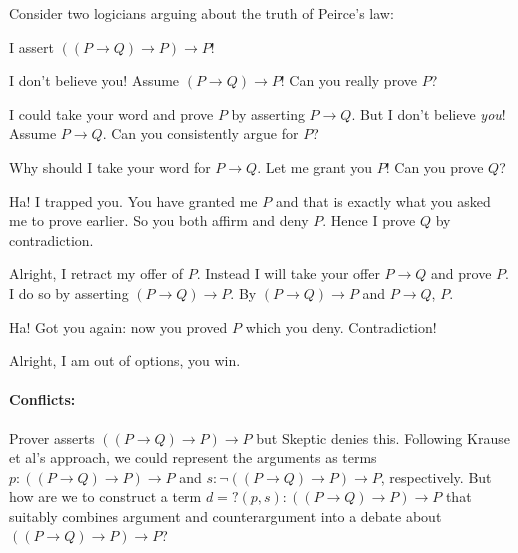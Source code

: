 \documentclass{IOS-Book-Article}
\begin{document}
\begin{example}\label{ex:prover-skeptic}
    Consider two logicians arguing about the truth of Peirce's law:

\begin{description}[leftmargin=3em,style=sameline]
\item[$P_1$:] I assert $((P\rightarrow Q)\rightarrow P)\rightarrow P$!
\item[$S_1$:] I don't believe you! Assume $(P\rightarrow Q)\rightarrow P$! Can you really prove $P$?
\item[$P_2$:] I could take your word and prove $P$ by asserting $P \rightarrow Q$. But I don't believe \emph{you}! Assume $P\rightarrow Q$. Can you consistently argue for $P$?
\item[$S_2$:] Why should I take your word for $P\rightarrow Q$. Let me grant you $P$! Can you prove $Q$?
\item[$P_3$:] Ha! I trapped you. You have granted me $P$ and that is exactly what you asked me to prove earlier. So you both affirm and deny $P$. Hence I prove $Q$ by contradiction.
\item[$S_3$:] Alright, I retract my offer of $P$. Instead I will take your offer $P\rightarrow Q$ and prove $P$. I do so by asserting $(P\rightarrow Q)\rightarrow P$. By $(P\rightarrow Q)\rightarrow P$ and $P\rightarrow Q$, $P$.
\item[$P$:] Ha! Got you again: now you proved $P$ which you deny. Contradiction!
\item[$S$:] Alright, I am out of options, you win.
\end{description}
\end{example}

  \paragraph{Conflicts:} Prover asserts $((P\rightarrow Q)\rightarrow P)\rightarrow P$ but Skeptic denies this. Following Krause et al's approach, we could represent the arguments as terms $p:((P\rightarrow Q)\rightarrow P)\rightarrow P$ and $s:\neg((P\rightarrow Q)\rightarrow P)\rightarrow P$, respectively. But how are we to construct a term $d = ?(p,s):((P\rightarrow Q)\rightarrow P)\rightarrow P$ that suitably combines argument and counterargument into a debate about $((P\rightarrow Q)\rightarrow P)\rightarrow P$?
\end{document}
